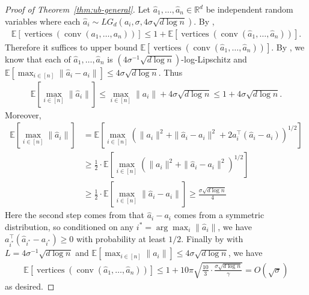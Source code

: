 \documentclass{article}\usepackage[a4paper,margin=20mm]{geometry}
\newcommand{\R}{\mathbb R}
\newcommand{\E}{\mathbb E}
\newcommand{\conv}{\operatorname{conv}}
\newcommand{\verts}{\operatorname{vertices}}
\begin{document}
\begin{proof}[Proof of Theorem~\ref{thm:ub-general}]
    Let $\hat{a}_1, \ldots, \hat{a}_n \in \R^d$ be independent random variables where each $\hat{a}_i \sim LG_d(a_i, \sigma, 4\sigma \sqrt{d\log n})$. By , 
    \begin{align*}
        \E[\verts(\conv(a_1, \ldots, a_n))]  \leq 1 + \E[\verts(\conv(\hat{a}_1, \ldots, \hat{a}_n))].
    \end{align*}
    Therefore it suffices to upper bound $\E[\verts(\conv(\hat{a}_1, \ldots, \hat{a}_n))]$.
    By , we know that each of $\hat{a}_1, \ldots, \hat{a}_n$ is $(4\sigma^{-1} \sqrt{d\log n})$-log-Lipschitz and $\E[\max_{i\in [n]}\|\hat{a}_i - a_i\|] \leq 4\sigma \sqrt{d\log n}$. Thus
    \begin{align*}
        \E[\max_{i\in [n]}\|\hat{a}_i\|] \leq \max_{i\in [n]} \|a_i\| + 4\sigma \sqrt{d\log n} \leq 1 + 4\sigma \sqrt{d\log n}.
    \end{align*}
    Moreover, 
    \begin{align*}
        \E[\max_{i\in [n]}\|\hat{a}_i\|] &= \E[\max_{i\in [n]}(\|a_i\|^2 + \|\hat{a}_i - a_i\|^2 + 2a_i^\top (\hat{a}_i - a_i))^{1/2}] \\
        &\geq \frac{1}{2}\cdot \E[\max_{i\in [n]}(\|a_i\|^2 + \|\hat{a}_i - a_i\|^2)^{1/2}] \\
        &\geq \frac{1}{2}\cdot \E[\max_{i\in [n]} \|\hat{a}_i - a_i\|] \geq \frac{\sigma \sqrt{d\log n}}{4}
    \end{align*}
    Here the second step comes from that $\hat{a}_i - a_i$ comes from a symmetric distribution, so conditioned on any $i^* = \arg \max_i \|\hat{a}_i\|$, we have $a_{i^*}^\top (\hat{a}_{i^*} - a_{i^*}) \geq 0$ with probability at least $1/2$.
    Finally by  with $L = 4\sigma^{-1} \sqrt{d\log n}$ and $\E[\max_{i \in [n]} \|a_i\|] \leq 4\sigma \sqrt{d\log n}$, we have
    \begin{align*}
         \E\left[ \verts\left(\conv(\hat{a}_1, \ldots, \hat{a}_n) \right) \right] 
         \leq  1 + 10\pi \sqrt{\frac{10}{3} \cdot \frac{\sigma \sqrt{d\log n}}{\gamma}} = O(\sqrt{\sigma} )
    \end{align*}
    as desired.
\end{proof}
\fi
\end{document}
